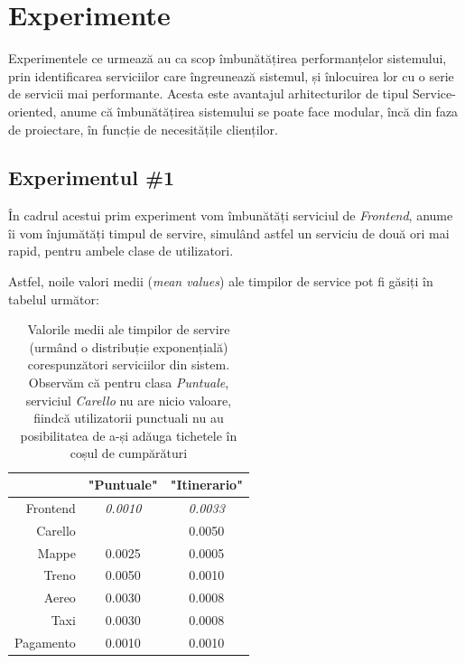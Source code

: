 \documentclass[12pt]{article}
\begin{document}
    \section{Experimente}
        Experimentele ce urmează au ca scop îmbunătățirea performanțelor sistemului, prin identificarea serviciilor care îngreunează sistemul, și înlocuirea lor cu o serie de servicii mai performante. Acesta este avantajul arhitecturilor de tipul Service-oriented, anume că îmbunătățirea sistemului se poate face modular, încă din faza de proiectare, în funcție de necesitățile clienților.

        \subsection{Experimentul \#1}
            În cadrul acestui prim experiment vom îmbunătăți serviciul de \textit{Frontend}, anume îi vom înjumătăți timpul de servire, simulând astfel un serviciu de două ori mai rapid, pentru ambele clase de utilizatori.

            Astfel, noile valori medii (\textit{mean values}) ale timpilor de service pot fi găsiți în tabelul următor:

            \begin{table}[!h]
                \centering
                \begin{tabular}{r|cc}
                    \multicolumn{1}{c|}{} & "Puntuale"      & "Itinerario"    \\ \hline
                    Frontend              & \textit{0.0010} & \textit{0.0033} \\
                    Carello               &                 & 0.0050          \\
                    Mappe                 & 0.0025          & 0.0005          \\
                    Treno                 & 0.0050          & 0.0010          \\
                    Aereo                 & 0.0030          & 0.0008          \\
                    Taxi                  & 0.0030          & 0.0008          \\
                    Pagamento             & 0.0010          & 0.0010         
                \end{tabular}
                \caption{Valorile medii ale timpilor de servire (urmând o distribuție exponențială) corespunzători serviciilor din sistem. Observăm că pentru clasa \textit{Puntuale}, serviciul \textit{Carello} nu are nicio valoare, fiindcă utilizatorii punctuali nu au posibilitatea de a-și adăuga tichetele în coșul de cumpărături}
            \end{table}
\end{document}
